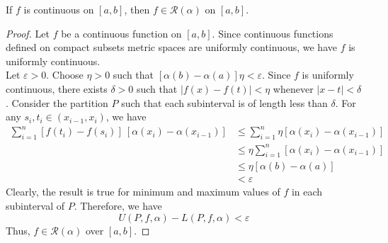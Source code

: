 \begin{theorem}
	If $f$ is continuous on $[a,b]$, then $f \in \mathscr{R}(\alpha)$ on $[a,b]$.
\end{theorem}
\begin{proof}
	Let $f$ be a continuous function on $[a,b]$.
	Since continuous functions defined on compact subsets metric spaces are uniformly continuous, we have $f$ is uniformly continuous.\\

	Let $\varepsilon > 0$.
	Choose $\eta > 0$ such that $[\alpha(b)-\alpha(a)]\eta < \varepsilon$.
	Since $f$ is uniformly continuous, there exists $\delta > 0$ such that $|f(x)-f(t)| < \eta$ whenever $|x-t| < \delta$.	
	Consider the partition $P$ such that each subinterval is of length less than $\delta$.
	For any $s_i,t_i \in (x_{i-1},x_i)$, we have
	\begin{align*}
	\sum_{i=1}^n [f(t_i) - f(s_i)] \ [\alpha(x_i)-\alpha(x_{i-1})] 
		& \le \sum_{i=1}^n \eta [\alpha(x_i)-\alpha(x_{i-1})] \\
		& \le \eta \sum_{i=1}^n [\alpha(x_i)-\alpha(x_{i-1})] \\
		&	\le \eta[\alpha(b)-\alpha(a)] \\
		& < \varepsilon 
	\end{align*}
	Clearly, the result is true for minimum and maximum values of $f$ in each subinterval of $P$.
	Therefore, we have
	\[ U(P,f,\alpha) - L(P,f,\alpha) < \varepsilon \]
	Thus, $f \in \mathscr{R}(\alpha)$ over $[a,b]$.
\end{proof}

